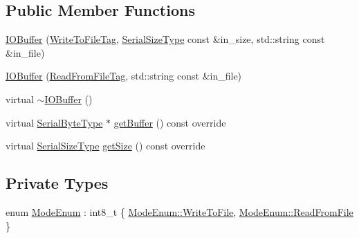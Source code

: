 \subsection*{Public Member Functions}
\begin{DoxyCompactItemize}
\item 
\hyperlink{structcheckpoint_1_1buffer_1_1_i_o_buffer_a56ee2b1bd3bdf4ba8ecbe35bf51a49f4}{I\+O\+Buffer} (\hyperlink{structcheckpoint_1_1buffer_1_1_i_o_buffer_1_1_write_to_file_tag}{Write\+To\+File\+Tag}, \hyperlink{namespacecheckpoint_a083f6674da3f94c2901b18c6d238217c}{Serial\+Size\+Type} const \&in\+\_\+size, std\+::string const \&in\+\_\+file)
\item 
\hyperlink{structcheckpoint_1_1buffer_1_1_i_o_buffer_a6f626a1311cea9ce4240708c59be5bff}{I\+O\+Buffer} (\hyperlink{structcheckpoint_1_1buffer_1_1_i_o_buffer_1_1_read_from_file_tag}{Read\+From\+File\+Tag}, std\+::string const \&in\+\_\+file)
\item 
virtual \hyperlink{structcheckpoint_1_1buffer_1_1_i_o_buffer_a7ff7df5a133119cb831e27d00b2a0ec8}{$\sim$\+I\+O\+Buffer} ()
\item 
virtual \hyperlink{namespacecheckpoint_ae57f01cdc0b81776c23b6c7c934c58f5}{Serial\+Byte\+Type} $\ast$ \hyperlink{structcheckpoint_1_1buffer_1_1_i_o_buffer_ac0ff5457dbbec216ce8620ad25e283fa}{get\+Buffer} () const override
\item 
virtual \hyperlink{namespacecheckpoint_a083f6674da3f94c2901b18c6d238217c}{Serial\+Size\+Type} \hyperlink{structcheckpoint_1_1buffer_1_1_i_o_buffer_a65774dab5b6397ae40b77282729fde2f}{get\+Size} () const override
\end{DoxyCompactItemize}
\subsection*{Private Types}
\begin{DoxyCompactItemize}
\item 
enum \hyperlink{structcheckpoint_1_1buffer_1_1_i_o_buffer_a17af037ab505e902bc6133309a92ded2}{Mode\+Enum} \+: int8\+\_\+t \{ \hyperlink{structcheckpoint_1_1buffer_1_1_i_o_buffer_a17af037ab505e902bc6133309a92ded2aa91ea5238090273cea8d2e0b0bed7540}{Mode\+Enum\+::\+Write\+To\+File}, 
\hyperlink{structcheckpoint_1_1buffer_1_1_i_o_buffer_a17af037ab505e902bc6133309a92ded2abe9348ae77ec17acd67aa1ff39a18d83}{Mode\+Enum\+::\+Read\+From\+File}
 \}
\end{DoxyCompactItemize}
